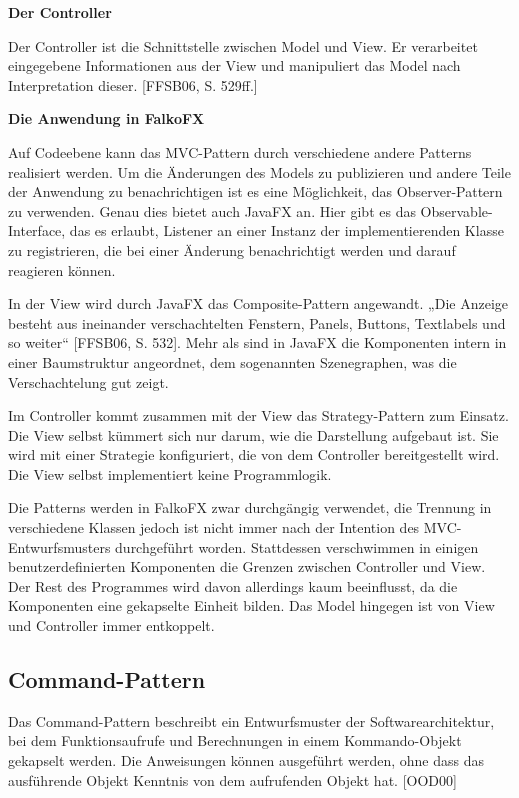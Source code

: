\textbf{Der Controller}

Der Controller ist die Schnittstelle zwischen Model und View. Er verarbeitet eingegebene Informationen aus der View und manipuliert das Model nach Interpretation dieser. [FFSB06, S. 529ff.]

\textbf{Die Anwendung in FalkoFX}

Auf Codeebene kann das MVC-Pattern durch verschiedene andere Patterns realisiert werden.
Um die Änderungen des Models zu publizieren und andere Teile der Anwendung zu benachrichtigen ist es eine Möglichkeit, das Observer-Pattern zu verwenden. Genau dies bietet auch JavaFX an. Hier gibt es das Observable-Interface, das es erlaubt, Listener an einer Instanz der implementierenden Klasse zu registrieren, die bei einer Änderung benachrichtigt werden und darauf reagieren können.

In der View wird durch JavaFX das Composite-Pattern angewandt. „Die Anzeige besteht aus ineinander verschachtelten Fenstern, Panels, Buttons, Textlabels und so weiter“ [FFSB06, S. 532]. Mehr als sind in JavaFX die Komponenten intern in einer Baumstruktur angeordnet, dem sogenannten Szenegraphen, was die Verschachtelung gut zeigt.

Im Controller kommt zusammen mit der View das Strategy-Pattern zum Einsatz. Die View selbst kümmert sich nur darum, wie die Darstellung aufgebaut ist. Sie wird mit einer Strategie konfiguriert, die von dem Controller bereitgestellt wird. Die View selbst implementiert keine Programmlogik.

Die Patterns werden in FalkoFX zwar durchgängig verwendet, die Trennung in verschiedene Klassen jedoch ist nicht immer nach der Intention des MVC-Entwurfsmusters durchgeführt worden. Stattdessen verschwimmen in einigen benutzerdefinierten Komponenten die Grenzen zwischen Controller und View. Der Rest des Programmes wird davon allerdings kaum beeinflusst, da die Komponenten eine gekapselte Einheit bilden. Das Model hingegen ist von View und Controller immer entkoppelt.
\subsection{Command-Pattern} \label{sec:patternCommand}
Das Command-Pattern beschreibt ein Entwurfsmuster der Softwarearchitektur, bei dem Funktionsaufrufe und Berechnungen in einem Kommando-Objekt gekapselt werden. Die Anweisungen können ausgeführt werden, ohne dass das ausführende Objekt Kenntnis von dem aufrufenden Objekt hat. [OOD00]

